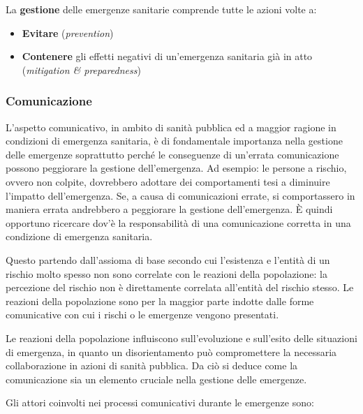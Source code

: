 La \textbf{gestione} delle emergenze sanitarie comprende tutte le azioni
volte a:

\begin{itemize}
\item
  \textbf{Evitare} (\emph{prevention})
\item
  \textbf{Contenere} gli effetti negativi di un'emergenza sanitaria già
  in atto (\emph{mitigation \& preparedness})
\end{itemize}

\subsubsection{Comunicazione}

L'aspetto comunicativo, in ambito di sanità pubblica ed a maggior
ragione in condizioni di emergenza sanitaria, è di fondamentale
importanza nella gestione delle emergenze soprattutto perché le
conseguenze di un'errata comunicazione possono peggiorare la gestione
dell'emergenza. Ad esempio: le persone a rischio, ovvero non colpite,
dovrebbero adottare dei comportamenti tesi a diminuire l'impatto
dell'emergenza. Se, a causa di comunicazioni errate, si comportassero in
maniera errata andrebbero a peggiorare la gestione dell'emergenza. È
quindi opportuno ricercare dov'è la responsabilità di una comunicazione
corretta in una condizione di emergenza sanitaria.

Questo partendo dall'assioma di base secondo cui l'esistenza e l'entità
di un rischio molto spesso non sono correlate con le reazioni della
popolazione: la percezione del rischio non è direttamente correlata
all'entità del rischio stesso. Le reazioni della popolazione sono per la
maggior parte indotte dalle forme comunicative con cui i rischi o le
emergenze vengono presentati.

Le reazioni della popolazione influiscono sull'evoluzione e sull'esito
delle situazioni di emergenza, in quanto un disorientamento può
compromettere la necessaria collaborazione in azioni di sanità pubblica.
Da ciò si deduce come la comunicazione sia un elemento cruciale nella
gestione delle emergenze.

Gli attori coinvolti nei processi comunicativi durante le emergenze
sono:

